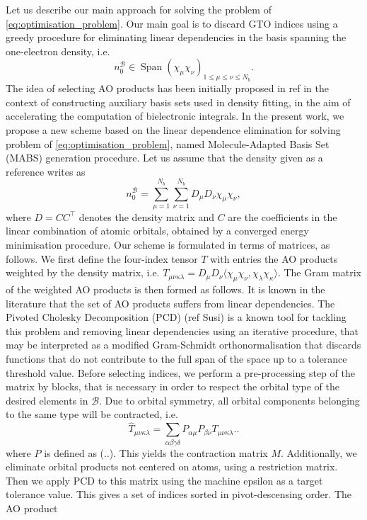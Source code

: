 \documentclass[a4paper,11pt]{article}
\DeclareMathOperator{\Span}{Span}
\begin{document}
Let us describe our main approach for solving the problem of \cref{eq:optimisation_problem}. 
Our main goal is to discard GTO indices using a greedy procedure for eliminating 
linear dependencies in the basis spanning the one-electron density, i.e. 
\[
    n_0^{\mathcal B} \in \Span(\chi_{\mu}\chi_{\nu})_{1\leq \mu\leq \nu\leq
    N_b}.
\]
The idea of selecting AO products has been initially proposed in ref in the context
of constructing auxiliary basis sets used in density fitting, in the aim of
accelerating the computation of bielectronic integrals. In the present
work, we propose a new scheme based on the linear dependence elimination for 
solving problem of \cref{eq:optimisation_problem}, named Molecule-Adapted Basis
Set (MABS) generation procedure. Let us assume that the density given as a reference 
writes as
\[
    n_0^{\mathcal B} =
    \sum_{\mu=1}^{N_b}\sum_{\nu=1}^{N_b}D_{\mu}D_{\nu}\chi_{\mu}\chi_{\nu},
\]
where $D=CC^\top$ denotes the density matrix and $C$ are the coefficients in the
linear combination of atomic orbitals, obtained by a converged energy minimisation 
procedure. Our scheme is formulated in terms of matrices, as follows. We first
define the four-index tensor $T$ with entries the AO products weighted by the
density matrix, i.e. $T_{\mu\nu\kappa\lambda} =
D_{\mu}D_{\nu}\langle\chi_{\mu}\chi_{\nu},\chi_{\lambda}\chi_{\kappa}\rangle$.
The Gram matrix of the weighted AO products is then formed as follows. It is
known in the literature that the set of AO products suffers from linear
dependencies. The Pivoted Cholesky Decomposition (PCD) (ref Susi) is a known tool for
tackling this problem and removing linear dependencies using an iterative
procedure, that may be interpreted as a modified Gram-Schmidt
orthonormalisation that discards functions that do not contribute to the full
span of the space up to a tolerance threshold value. Before selecting indices,
we perform a pre-processing step of the matrix by blocks, that is necessary in order 
to respect the orbital type of the desired elements in $\mathcal B$. Due to orbital 
symmetry, all orbital components belonging to the same type will be contracted,
i.e. 
\[
    \widehat T_{\mu\nu\kappa\lambda} = \sum_{\alpha\beta\gamma\delta}
    P_{\alpha\mu}P_{\beta\nu}T_{\mu\nu\kappa\lambda}..
\]
where $P$ is defined as (..). This yields the contraction matrix $M$. Additionally,
we eliminate orbital products not centered on atoms, using a restriction matrix. Then we 
apply PCD to this matrix using the machine epsilon as a target tolerance value. This 
gives a set of indices sorted in pivot-descensing order. The AO product
\end{document}
